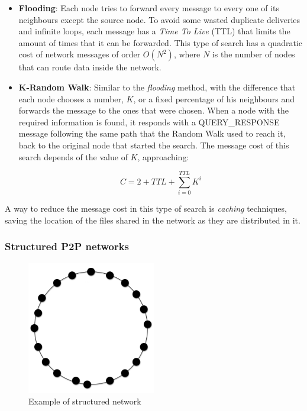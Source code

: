 \begin{itemize}
    \item \textbf{Flooding}: 
Each node tries to forward every message to every one of its neighbours except
the source node. To avoid some wasted duplicate deliveries and infinite loops,
each message has a \textit{Time To Live} (TTL) that limits the amount of times
that it can be forwarded. This type of search has a quadratic cost of network
messages of order $O(N^2)$, where $N$ is the number of nodes that can route data
inside the network.
    \item \textbf{K-Random Walk}: Similar to the \textit{flooding} method, with
the difference that each node chooses a number, $K$, or a fixed percentage of his
neighbours and forwards the message to the ones that were chosen. When a node
with the required information is found, it responds with a QUERY\_RESPONSE
message following the same path that the Random Walk used to reach it, back to
the original node that started the search. The message cost of this search
depends of the value of $K$, approaching:

\begin{equation}
\label{eq:krandomwalk}
 C = 2 + TTL +
\sum_{i=0}^{TTL} K^i
\end{equation}

\end{itemize}

A way to reduce the message cost in this type of search is \textit{caching}
techniques, saving the location of the files shared in the network
as they are distributed in it.

\subsubsection{Structured P2P networks}
\label{sec:p2p_estructured}

\begin{figure}
\center
\includegraphics[width=0.5\textwidth]{img/p2p-structured}
\caption{Example of structured network}
\label{fig:p2p_estructured}
\end{figure}


